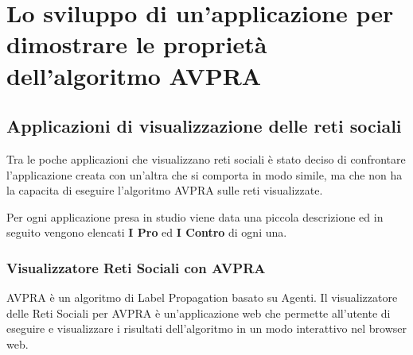 \documentclass[a4paper,12pt]{report}
\begin{document}
\chapter[Lo sviluppo dell'applicazione]{Lo sviluppo di un'applicazione per dimostrare le proprietà dell'algoritmo AVPRA}

	\section{Applicazioni di visualizzazione delle reti sociali}
		Tra le poche applicazioni che visualizzano reti sociali è stato deciso di confrontare l'applicazione creata con un'altra che si comporta in modo simile, ma che non ha la capacita di eseguire l'algoritmo AVPRA sulle reti visualizzate.

		Per ogni applicazione presa in studio viene data una piccola descrizione ed in seguito vengono elencati \textbf{I Pro} ed \textbf{I Contro} di ogni una.

		\subsection{Visualizzatore Reti Sociali con AVPRA}
		AVPRA è un algoritmo di Label Propagation basato su Agenti.
		Il visualizzatore delle Reti Sociali per AVPRA è un'applicazione web che permette all'utente di
		eseguire e visualizzare i risultati dell'algoritmo in un modo interattivo nel browser web.
		
\end{document}
